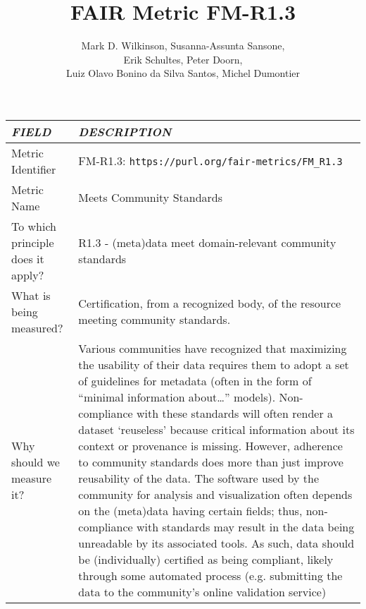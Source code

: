 \documentclass[english]{article}
\begin{document}
\title{FAIR Metric FM-R1.3}

\author{Mark D. Wilkinson, Susanna-Assunta Sansone, \\Erik Schultes, Peter Doorn,\\ 
Luiz Olavo Bonino da Silva Santos, Michel Dumontier}

\maketitle

\newpage





\begin{longtable}{|p{5cm}|p{9cm}|}


\hline
\emph{FIELD} & \emph{DESCRIPTION} \\
\hline
Metric Identifier &   FM-R1.3: \verb"https://purl.org/fair-metrics/FM_R1.3"
\\


\hline
Metric Name &   



Meets Community Standards


 \\



\hline
To which principle does it apply? &   


R1.3 - (meta)data meet domain-relevant community standards

\\



\hline
What is being measured? & 


Certification, from a recognized body, of the resource meeting community standards.

\\



\hline
Why should we measure it? & 

Various communities have recognized that maximizing the usability of their data requires them to adopt a set of guidelines for metadata (often in the form of “minimal information about…” models).  Non-compliance with these standards will often render a dataset ‘reuseless’ because critical information about its context or provenance is missing.  However, adherence to community standards does more than just improve reusability of the data. The software used by the community for analysis and visualization often depends on the (meta)data having certain fields; thus, non-compliance with standards may result in the data being unreadable by its associated tools.  As such, data should be (individually) certified as being compliant, likely through some automated process (e.g. submitting the data to the community’s online validation service)



\end{longtable}
\end{document}
